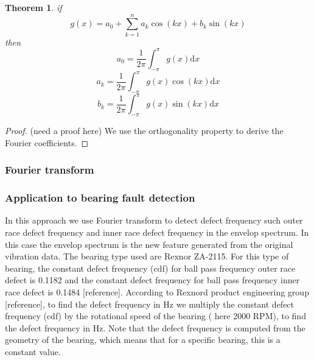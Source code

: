 \documentclass[11pt, oneside]{article}   	%
\newtheorem{theorem}{Theorem}
\newtheorem{proof}{Proof}
\begin{document}
\begin{theorem}
if 
\begin{equation}
g(x) = a_{0} + \sum_{k=1}^{n}a_{k}\cos(kx)+b_{k}\sin(kx)
\end{equation}
then 
\begin{equation}
a_{0} = \frac{1}{2\pi}\int_{-\pi}^{\pi}g(x)\mathrm{d}x
\end{equation}
\begin{equation}
a_{k} = \frac{1}{2\pi}\int_{-\pi}^{\pi}g(x)\cos(kx)\mathrm{d}x
\end{equation}
\begin{equation}
b_{k} = \frac{1}{2\pi}\int_{-\pi}^{\pi}g(x)\sin(kx)\mathrm{d}x
\end{equation}
\end{theorem}

\begin{proof}
(need a proof here) We use the orthogonality property to derive the Fourier coefficients.
\end{proof}






\subsubsection{Fourier transform}








\subsubsection{Application to bearing fault detection}
In this approach we use Fourier transform to detect defect frequency such outer race defect frequency and inner race defect frequency in the envelop spectrum. In this case the envelop spectrum is the new feature generated from the original vibration data. The bearing type used are Rexnor ZA-2115. For this type of bearing, the constant defect frequency (cdf) for ball pass frequency outer race defect is 0.1182 and the constant defect frequency for ball pass frequency inner race defect is 0.1484 [reference]. According to Rexnord product engineering group [reference], to find the defect frequency in Hz we multiply the constant defect frequency (cdf) by the rotational speed of the bearing ( here 2000 RPM), to find the defect frequency in Hz. Note that the defect frequency is computed from the geometry of the bearing, which means that for a specific bearing, this is a constant value. 
\end{document}
